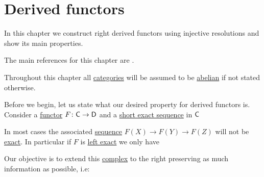 \documentclass[../../main]{subfiles}
\begin{document}
\chapter{Derived functors}

In this chapter we construct right derived functors using injective resolutions and show its main properties.

The main references for this chapter are \cite{weibelIntroductionHomologicalAlgebra1994, gelfandMethodsHomologicalAlgebra2003}.

Throughout this chapter all \hyperref[def:category]{categories} will be assumed to be \hyperref[def:abelian-category]{abelian} if not stated otherwise.

Before we begin, let us state what our desired property for derived functors is.
Consider a \hyperref[def:functor]{functor} \(F\colon \mathsf{C} \to \mathsf{D}\) and a \hyperref[def:exact-sequence]{short exact sequence} in \(\mathsf{C}\)
\begin{center}
\end{center}
In most cases the associated \hyperref[def:complex]{sequence} \(F(X) \to F(Y) \to F(Z)\) will not be \hyperref[def:exact-sequence]{exact}.
In particular if \(F\) is \hyperref[def:exact-functor]{left exact} we only have
\begin{center}
\end{center}
Our objective is to extend this \hyperref[def:complex]{complex} to the right preserving as much information as possible, i.e:
\begin{center}
\end{center}
\end{document}
